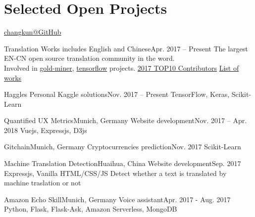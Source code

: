 \section{\textbf{Selected Open Projects}}
  \resumeSubHeadingListStart

    {\href{https://github.com/changkun/}{changkun@GitHub}}

    \resumeSubheading
      {Translation Works}{}
      {includes English and Chinese}{Apr. 2017 -- Present}
      \resumeItemListStart
          {The largest EN-CN open source translation community in the word. \\Involved in \href{https://github.com/xitu/gold-miner/}{gold-miner}, \href{https://github.com/xitu/tensorflow}{tensorflow} projects. \href{https://juejin.im/post/5a71284c6fb9a01ca87245a7}{2017 TOP10 Contributors}}
          {\href{https://github.com/changkun/translation}{List of works}}
      \resumeItemListEnd

    \resumeSubheading
      {Haggles}{}
      {Personal Kaggle solutions}{Nov. 2017 -- Present}
      \resumeItemListStart
          {TensorFlow, Keras, Scikit-Learn}
      \resumeItemListEnd

    \resumeSubheading
      {Quantified UX Metrics}{Munich, Germany}
      {Website development}{Nov. 2017 -- Apr. 2018}
      \resumeItemListStart
          {Vuejs, Expressjs, D3js}
      \resumeItemListEnd

    \resumeSubheading
      {Gitchain}{Munich, Germany}
      {Cryptocurrencies prediction}{Nov. 2017}
      \resumeItemListStart
          {Scikit-Learn}
      \resumeItemListEnd

    \resumeSubheading
      {Machine Translation Detection}{Huaihua, China}
      {Website development}{Sep. 2017}
      \resumeItemListStart
          {Expressjs, Vanilla HTML/CSS/JS}
          {Detect whether a text is translated by machine traslation or not}
      \resumeItemListEnd

    \resumeSubheading
      {Amazon Echo Skill}{Munich, Germany}
      {Voice assistant}{Apr. 2017 - Aug. 2017}
      \resumeItemListStart
          {Python, Flask, Flask-Ask, Amazon Serverless, MongoDB}
      \resumeItemListEnd

